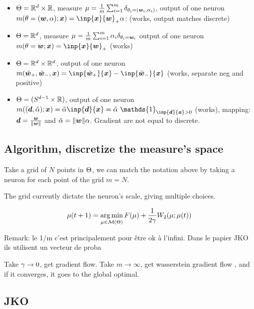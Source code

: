 \begin{itemize}
	\item $\Theta = \mathbb{R}^d \times \mathbb{R}$, measure $\mu = \frac{1}{m} \sum_{i=1}^{m} \delta_{\theta_i = ({\bm{w}}_i, \alpha_i)}$, output of one neuron $m(\param=(\vw,\alpha); \vx) = \inp{\vx}{\vw}_+ \alpha$: (works, output matches discrete)
	\item $\Theta = \mathbb{R}^d$, measure $\mu = \frac{1}{m} \sum_{i=1}^{m} \alpha_i \delta_{\theta_i = {\bm{w}}_i}$ output of one neuron $m(\param=\vw; \vx) = \inp{\vx}{\vw}_+$ (works)
	\item $\Theta = \mathbb{R}^d \times \mathbb{R}^d$, output of one neuron $m(\tilde{\vw}_+, \tilde{\vw}_-, \vx) = \inp{\tilde{\vw}_+}{\vx} - \inp{\tilde{\vw}_-}{\vx}$ (works, separate neg and positive)
	\item $\Theta = (S^{d-1} \times \mathbb{R})$, output of one neuron $m((\vd, \tilde{\alpha}); \vx) = \tilde{\alpha} \inp{\vd}{\vx} = \tilde{\alpha}\  \mathds{1}_{\inp{\vd}{\vx}>0} $ (works), mapping: ${\bm{d}} = \frac{{\bm{w}}}{\lVert{\bm{w}}\rVert}$ and $\tilde{\alpha}=\lVert{\bm{w}}\rVert \alpha$. Gradient are not equal to discrete.
\end{itemize}

\subsection{Algorithm, discretize the measure's space}

Take a grid of $N$ points in $\Theta$, we can match the notation above by taking a neuron for each point of the grid $m=N$.

The grid currently dictate the neuron's scale, giving multiple choices.

\begin{equation}
	\mu(t+1) = \operatorname*{arg\,min}_{\mu \in \mathcal{M}(\Theta)} F(\mu) + \frac{1}{2 \gamma} W_2(\mu; \mu(t))
\end{equation}


Remark: le 1/m c'est principalement pour être ok à l'infini. Dans le papier JKO \citep{carlierConvergenceEntropicSchemes2017} ils utilisent un vecteur de proba

Take $\gamma \to 0$, get gradient flow. Take $m \to \infty$, get wasserstein gradient flow \citep{bachGradientDescentInfinitely2021}, and if it converges, it goes to the global optimal.

\subsection{JKO}

